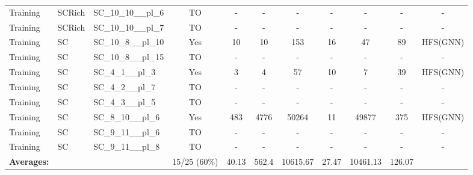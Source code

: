 \documentclass{article}
\begin{document}
\begin{tabular}{lllcccccccc}
Training & SCRich & SC\_10\_10\_\_pl\_6 & TO & - & - & - & - & - & - & - \\
Training & SCRich & SC\_10\_10\_\_pl\_7 & TO & - & - & - & - & - & - & - \\
Training & SC & SC\_10\_8\_\_pl\_10 & Yes & 10 & 10 & 153 & 16 & 47 & 89 & HFS(GNN) \\
Training & SC & SC\_10\_8\_\_pl\_15 & TO & - & - & - & - & - & - & - \\
Training & SC & SC\_4\_1\_\_pl\_3 & Yes & 3 & 4 & 57 & 10 & 7 & 39 & HFS(GNN) \\
Training & SC & SC\_4\_2\_\_pl\_7 & TO & - & - & - & - & - & - & - \\
Training & SC & SC\_4\_3\_\_pl\_5 & TO & - & - & - & - & - & - & - \\
Training & SC & SC\_8\_10\_\_pl\_6 & Yes & 483 & 4776 & 50264 & 11 & 49877 & 375 & HFS(GNN) \\
Training & SC & SC\_9\_11\_\_pl\_6 & TO & - & - & - & - & - & - & - \\
Training & SC & SC\_9\_11\_\_pl\_8 & TO & - & - & - & - & - & - & - \\
\textbf{Averages:} & & & 15/25 (60\%) & 40.13 & 562.4 & 10615.67 & 27.47 & 10461.13 & 126.07 & \\
\bottomrule
\end{tabular}
\newpage
\end{document}
